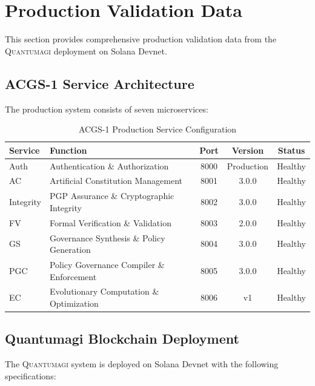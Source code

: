 \documentclass[10pt,twocolumn]{article}
\newcommand{\quantumagi}{\textsc{Quantumagi}}
\theoremstyle{definition}
\begin{document}
\section{Production Validation Data}
\label{sec:appendix_production}
This section provides comprehensive production validation data from the \quantumagi{} deployment on Solana Devnet.

\subsection{ACGS-1 Service Architecture}
The production system consists of seven microservices:

\begin{table}[H]
\centering
\caption{ACGS-1 Production Service Configuration}
\label{tab:acgs_services}
\small
\begin{tabular}{@{}lp{4.5cm}ccc@{}}
\toprule
\textbf{Service} & \textbf{Function} & \textbf{Port} & \textbf{Version} & \textbf{Status} \\
\midrule
Auth & Authentication \& Authorization & 8000 & Production & Healthy \\
AC & Artificial Constitution Management & 8001 & 3.0.0 & Healthy \\
Integrity & PGP Assurance \& Cryptographic Integrity & 8002 & 3.0.0 & Healthy \\
FV & Formal Verification \& Validation & 8003 & 2.0.0 & Healthy \\
GS & Governance Synthesis \& Policy Generation & 8004 & 3.0.0 & Healthy \\
PGC & Policy Governance Compiler \& Enforcement & 8005 & 3.0.0 & Healthy \\
EC & Evolutionary Computation \& Optimization & 8006 & v1 & Healthy \\
\bottomrule
\end{tabular}
\end{table}

\subsection{Quantumagi Blockchain Deployment}
The \quantumagi{} system is deployed on Solana Devnet with the following specifications:
\end{document}
